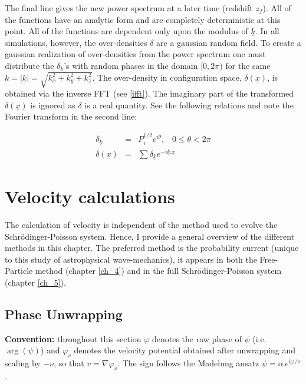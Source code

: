 \noindent The final line gives the new power spectrum at a later time (redshift $z_f$). All of the functions have an analytic form and are completely deterministic at this point. All of the functions are dependent only upon the modulus of $\underline{k}$. In all simulations, however, the over-densities $\delta$ are a gaussian random field. To create a gaussian realization of over-densities from the power spectrum one must distribute the $\delta_{k}$'s with random phases in the domain $[0,2\pi)$ for the same $k=|\underline{k}|=\sqrt{k_x^2+k_y^2+k_z^2}$. The over-density in configuration space, $\delta(\underline{x})$, is obtained via the inverse FFT (see \ref{ifft}). The imaginary part of the transformed $\delta (\underline{x})$ is ignored as $\delta$ is a real quantity. See the following relations and note the Fourier transform in the second line:


\begin{eqnarray}
\delta_{\underline{k}} &=& P_i^{1/2} e^{i\theta}, \;\;\; 0 \le \theta < 2\pi \\
\delta (\underline{x}) &=& \sum \delta_{\underline{k}} e^{-i \underline{k}.\underline{x}}
\label{ifft}
\end{eqnarray}

\section{Velocity calculations}
The calculation of velocity is independent of the method used to evolve the Schr\"odinger-Poisson system. Hence, I provide a general overview of the different methods in this chapter. The preferred method is the probability current (unique to this study of astrophysical wave-mechanics), it appears in both the Free-Particle method (chapter \ref{ch_4}) and in the full Schr\"odinger-Poisson system (chapter \ref{ch_5}).


\subsection{Phase Unwrapping}
\noindent \textbf{Convention:} throughout this section $\varphi$ denotes the raw phase of $\psi$ (i.e.\ $\arg(\psi)$) and $\varphi_v$ denotes the velocity potential obtained after unwrapping and scaling by $-\nu$, so that $v = \nabla \varphi_v$. The sign follows the Madelung ansatz $\psi = \alpha\, e^{i\varphi/\nu}$.


